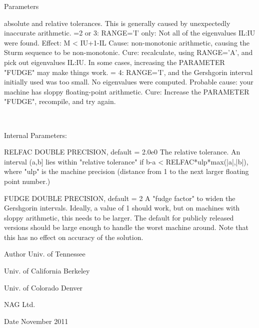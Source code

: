 \begin{DoxyParams}[1]{Parameters}
\begin{DoxyVerb}
                        absolute and relative tolerances.  This is
                        generally caused by unexpectedly inaccurate
                        arithmetic.
                =2 or 3: RANGE='I' only: Not all of the eigenvalues
                        IL:IU were found.
                        Effect: M < IU+1-IL
                        Cause:  non-monotonic arithmetic, causing the
                                Sturm sequence to be non-monotonic.
                        Cure:   recalculate, using RANGE='A', and pick
                                out eigenvalues IL:IU.  In some cases,
                                increasing the PARAMETER "FUDGE" may
                                make things work.
                = 4:    RANGE='I', and the Gershgorin interval
                        initially used was too small.  No eigenvalues
                        were computed.
                        Probable cause: your machine has sloppy
                                        floating-point arithmetic.
                        Cure: Increase the PARAMETER "FUDGE",
                              recompile, and try again.\end{DoxyVerb}
 \\
\hline
\end{DoxyParams}
\begin{DoxyParagraph}{Internal Parameters\+: }
\begin{DoxyVerb}  RELFAC  DOUBLE PRECISION, default = 2.0e0
          The relative tolerance.  An interval (a,b] lies within
          "relative tolerance" if  b-a < RELFAC*ulp*max(|a|,|b|),
          where "ulp" is the machine precision (distance from 1 to
          the next larger floating point number.)

  FUDGE   DOUBLE PRECISION, default = 2
          A "fudge factor" to widen the Gershgorin intervals.  Ideally,
          a value of 1 should work, but on machines with sloppy
          arithmetic, this needs to be larger.  The default for
          publicly released versions should be large enough to handle
          the worst machine around.  Note that this has no effect
          on accuracy of the solution.\end{DoxyVerb}
 
\end{DoxyParagraph}
\begin{DoxyAuthor}{Author}
Univ. of Tennessee 

Univ. of California Berkeley 

Univ. of Colorado Denver 

N\+A\+G Ltd. 
\end{DoxyAuthor}
\begin{DoxyDate}{Date}
November 2011 
\end{DoxyDate}
